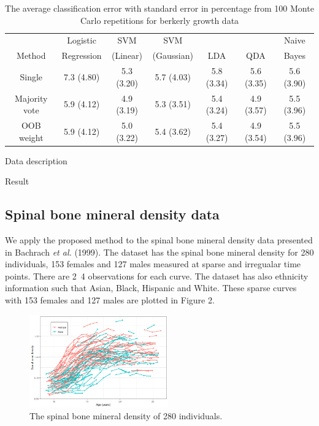 \documentclass[eng]{csam}
\begin{document}
\begin{table}[ht]
	\footnotesize
	\centering
	\caption{The average classification error with standard error in percentage from 100 Monte Carlo repetitions for berkerly growth data}
	\tabcolsep=11.5pt
	\begin{tabular}{ccccccc}
		\hline \hline
		& Logistic   & SVM      & SVM        &     &     & Naive \\
		Method & Regression & (Linear) & (Gaussian) & LDA & QDA & Bayes \\ 
		\hline
		Single        & 7.3 (4.80) & 5.3 (3.20) & 5.7 (4.03) & 5.8 (3.34) & 5.6 (3.35) & 5.6 (3.90) \\ 
		Majority vote & 5.9 (4.12) & 4.9 (3.19) & 5.3 (3.51) & 5.4 (3.24) & 4.9 (3.57) & 5.5 (3.96) \\ 
		OOB weight    & 5.9 (4.12) & 5.0 (3.22) & 5.4 (3.62) & 5.4 (3.27) & 4.9 (3.54) & 5.5 (3.96) \\ 
		\hline \hline
	\end{tabular}
\end{table}

{\color{red}
	Data description
	
	Result	
}


\subsection{Spinal bone mineral density data}
We apply the proposed method to the spinal bone mineral density data presented in Bachrach {\em et al.} (1999). The dataset has the spinal bone mineral density for 280 individuals, 153 females and 127 males measured at sparse and irregualar time points. There are 2~4 observations for each curve. The dataset has also ethnicity information such that Asian, Black, Hispanic and White. These sparse curves with 153 females and 127 males are plotted in Figure 2.
\begin{figure}[h]
	\centering
	\includegraphics[height=4cm,keepaspectratio=true]{img/spnbmd.png}
	\caption{The spinal bone mineral density of 280 individuals.}
	\label{fig:rsxb}
\end{figure}
\end{document}
